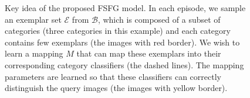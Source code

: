 \documentclass[10pt,twocolumn,letterpaper]{article}
\begin{document}

%
%
%

\begin{figure}[t!]
\caption{Key idea of the proposed FSFG model. In each episode, we sample an exemplar set $\mathcal{E}$ from $\mathcal{B}$, which is composed of a subset of categories (three categories in this example) and each category contains few exemplars (the images with red border). We wish to learn a mapping $M$ that can map these exemplars into their corresponding category classifiers (the dashed lines). The mapping parameters are learned so that these classifiers can correctly distinguish the query images (the images with yellow border).}
\label{fig:mapping}
\end{figure}
\end{document}
